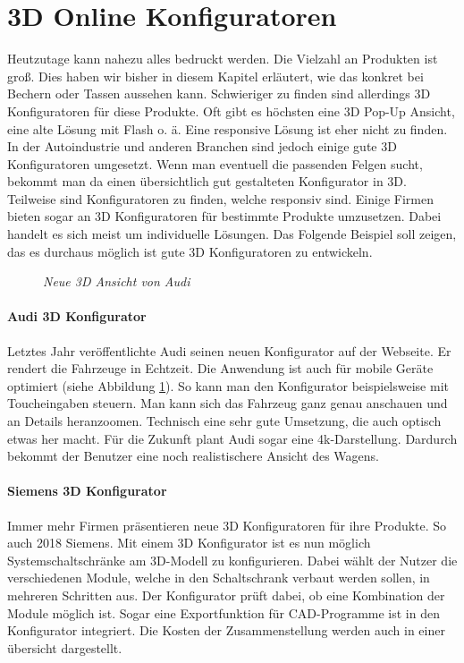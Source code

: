 \section{3D Online Konfiguratoren}
\label{sec:3dconfigurators}
%
Heutzutage kann nahezu alles bedruckt werden. Die Vielzahl an Produkten ist groß. Dies haben wir bisher in diesem Kapitel erläutert, wie das konkret bei Bechern oder Tassen aussehen kann. Schwieriger zu finden sind allerdings 3D Konfiguratoren für diese Produkte. Oft gibt es höchsten eine 3D Pop-Up Ansicht, eine alte Lösung mit Flash o. ä. Eine responsive Lösung ist eher nicht zu finden. \\
In der Autoindustrie und anderen Branchen sind jedoch einige gute 3D Konfiguratoren umgesetzt. Wenn man eventuell die passenden Felgen sucht, bekommt man da einen übersichtlich gut gestalteten Konfigurator in 3D. Teilweise sind Konfiguratoren zu finden, welche responsiv sind. Einige Firmen bieten sogar an 3D Konfiguratoren für bestimmte Produkte umzusetzen. Dabei handelt es sich meist um individuelle Lösungen. Das Folgende Beispiel soll zeigen, das es durchaus möglich ist gute 3D Konfiguratoren zu entwickeln.
%
\begin{figure}[]
	\centering
	{}
	\caption[Audi Konfigurator]{\textit{Neue 3D Ansicht von Audi}}
	\label{fig:audi}
\end{figure}
%
%
\paragraph{Audi 3D Konfigurator}Letztes Jahr veröffentlichte Audi seinen neuen Konfigurator auf der Webseite. Er rendert die Fahrzeuge in Echtzeit. Die Anwendung ist auch für mobile Geräte optimiert (siehe Abbildung \ref{fig:audi}). So kann man den Konfigurator beispielsweise mit Toucheingaben steuern. Man kann sich das Fahrzeug ganz genau anschauen und an Details heranzoomen. Technisch eine sehr gute Umsetzung, die auch optisch etwas her macht. Für die Zukunft plant Audi sogar eine 4k-Darstellung. Dardurch bekommt der Benutzer eine noch realistischere Ansicht des Wagens. \\
%
%
\paragraph{Siemens 3D Konfigurator}Immer mehr Firmen präsentieren neue 3D Konfiguratoren für ihre Produkte. So auch 2018 Siemens. Mit einem 3D Konfigurator ist es nun möglich Systemschaltschränke am 3D-Modell zu konfigurieren. Dabei wählt der Nutzer die verschiedenen Module, welche in den Schaltschrank verbaut werden sollen, in mehreren Schritten aus. Der Konfigurator prüft dabei, ob eine Kombination der Module möglich ist. Sogar eine Exportfunktion für CAD-Programme ist in den Konfigurator integriert. Die Kosten der Zusammenstellung werden auch in einer übersicht dargestellt.\\
%
